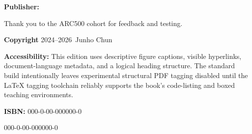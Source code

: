 
\makeatletter
\providecommand{\DedicationTo}{}
\providecommand{\DedicationWhy}{}
\providecommand{\ImprintPublisher}{}
\providecommand{\ImprintCity}{}
\providecommand{\ImprintEdition}{}
\providecommand{\ImprintThanks}{Thank you to the ARC500 cohort for feedback and testing.}
\providecommand{\ImprintCopyrightYears}{2024--2026}
\providecommand{\ImprintHolder}{Junho Chun}
\providecommand{\ImprintLicense}{}
\providecommand{\ImprintISBN}{000-0-00-000000-0}
\makeatother

\thispagestyle{empty}
\vspace*{1.8cm}

{\itshape \DedicationTo\par}
\vspace{0.2\baselineskip}
{\itshape \DedicationWhy\par}

\vfill

{\small
\textbf{Publisher:} \ImprintPublisher \ImprintCity\par
\ImprintEdition\par
\ImprintThanks\par

\vspace{1.2\baselineskip}
\textbf{Copyright} \ImprintCopyrightYears\ \ImprintHolder\par
\ImprintLicense\par

\vspace{1.2\baselineskip}
\textbf{Accessibility:} This edition uses descriptive figure captions,
visible hyperlinks, document-language metadata, and a logical heading
structure. The standard build intentionally leaves experimental structural
PDF tagging disabled until the LaTeX tagging toolchain reliably supports the
book's code-listing and boxed teaching environments.\par

\vspace{1.2\baselineskip}
\textbf{ISBN:} \ImprintISBN\par
}

\vspace{1.2cm}
\noindent\begingroup
\setlength{\fboxsep}{0pt}

\par\medskip
{\footnotesize \ImprintISBN}
\endgroup
